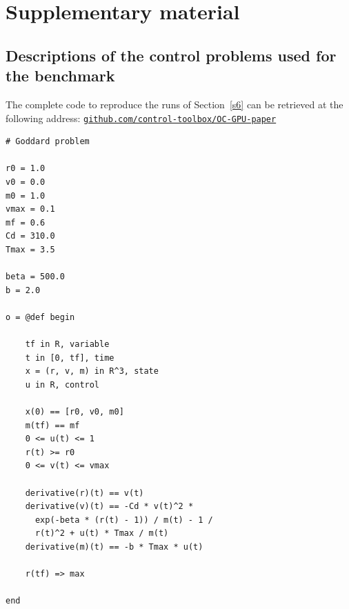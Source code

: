 % 



\newpage
\appendix 

\section{Supplementary material}

\subsection{Descriptions of the control problems used for the benchmark}
\label{sa1}
The complete code to reproduce the runs of Section~\ref{s6} can be retrieved at the following address: \href{https://github.com/control-toolbox/OC-GPU-paper}{\texttt{github.com/control-toolbox/OC-GPU-paper}}\\

{\small
\begin{verbatim}
# Goddard problem

r0 = 1.0     
v0 = 0.0
m0 = 1.0 
vmax = 0.1 
mf = 0.6   
Cd = 310.0
Tmax = 3.5

beta = 500.0
b = 2.0

o = @def begin

    tf in R, variable
    t in [0, tf], time
    x = (r, v, m) in R^3, state
    u in R, control

    x(0) == [r0, v0, m0]
    m(tf) == mf
    0 <= u(t) <= 1
    r(t) >= r0
    0 <= v(t) <= vmax

    derivative(r)(t) == v(t)
    derivative(v)(t) == -Cd * v(t)^2 *
      exp(-beta * (r(t) - 1)) / m(t) - 1 /
      r(t)^2 + u(t) * Tmax / m(t)
    derivative(m)(t) == -b * Tmax * u(t)

    r(tf) => max

end
\end{verbatim}
}

